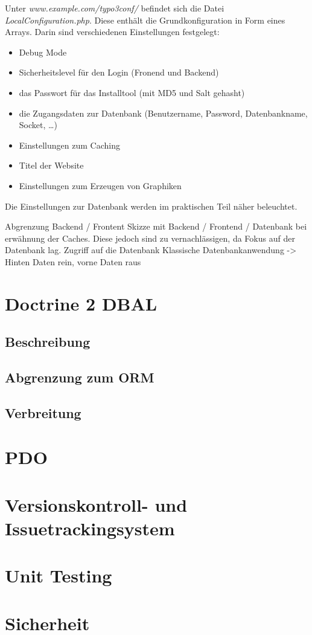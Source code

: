 Unter \textit{www.example.com/typo3conf/} befindet sich die Datei \textit{LocalConfiguration.php}. Diese enthält die Grundkonfiguration in Form eines Arrays. Darin sind verschiedenen Einstellungen festgelegt:

\begin{itemize}
	\item Debug Mode
	\item Sicherheitslevel für den Login (Fronend und Backend)
	\item das Passwort für das Installtool (mit MD5 und Salt gehasht)
	\item die Zugangsdaten zur Datenbank (Benutzername, Password, Datenbankname, Socket, …)
	\item Einstellungen zum Caching
	\item Titel der Website
	\item Einstellungen zum Erzeugen von Graphiken
\end{itemize}

Die Einstellungen zur Datenbank werden im praktischen Teil näher beleuchtet.

		Abgrenzung Backend / Frontent
		Skizze mit Backend / Frontend / Datenbank bei erwähnung der Caches. Diese jedoch sind zu vernachlässigen, da
		Fokus auf der Datenbank lag.
		Zugriff auf die Datenbank
		Klassische Datenbankanwendung -> Hinten Daten rein, vorne Daten raus
\section{Doctrine 2 DBAL}
	\subsection{Beschreibung}
	\subsection{Abgrenzung zum ORM}
	\subsection{Verbreitung}
\section{PDO}
\section{Versionskontroll- und Issuetrackingsystem}

\section{Unit Testing}

\section{Sicherheit}

